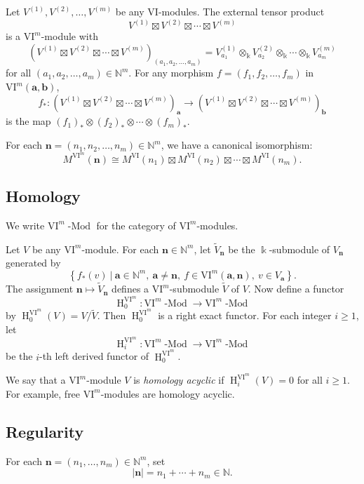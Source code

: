 \documentclass{amsart}
\numberwithin{equation}{section}
\DeclareMathOperator{\Mod}{-Mod}
\DeclareMathOperator{\HH}{H}
\newcommand{\N}{{\mathbb{N}}}
\newcommand{\VI}{{\mathrm{VI}}}
\begin{document}
Let $V^{(1)}, V^{(2)}, \ldots, V^{(m)}$ be any $\VI$-modules. The external tensor product 
\[ V^{(1)}\boxtimes V^{(2)}\boxtimes \cdots\boxtimes V^{(m)} \] 
is a $\VI^m$-module with
\[ \left(V^{(1)}\boxtimes V^{(2)}\boxtimes \cdots\boxtimes V^{(m)}\right)_{(a_1, a_2, \ldots, a_m)} = V^{(1)}_{a_1}\otimes_{\Bbbk} V^{(2)}_{a_2}\otimes_{\Bbbk} \cdots\otimes_{\Bbbk} V^{(m)}_{a_m} \] 
for all $(a_1, a_2, \ldots, a_m)\in \N^m$. For any morphism $f=(f_1, f_2, \ldots, f_m)$ in $\VI^m(\mathbf{a}, \mathbf{b})$, 
\[ f_*:  \left(V^{(1)}\boxtimes V^{(2)}\boxtimes \cdots\boxtimes V^{(m)}\right)_{\mathbf{a}} \to  \left(V^{(1)}\boxtimes V^{(2)}\boxtimes \cdots\boxtimes V^{(m)}\right)_{\mathbf{b}} \]
is the map $(f_1)_* \otimes (f_2)_* \otimes \cdots\otimes (f_m)_*$.  

For each $\mathbf{n}=(n_1, n_2, \ldots, n_m)\in \N^m$, we have a canonical isomorphism:
\begin{equation} \label{eq: tensor}
   M^{\VI^m}(\mathbf{n}) \cong M^{\VI}(n_1) \boxtimes M^{\VI}(n_2) \boxtimes \cdots \boxtimes M^{\VI}(n_m).
\end{equation}

\subsection{Homology}
We write $\VI^m\Mod$ for the category of $\VI^m$-modules. 

Let $V$ be any $\VI^m$-module. For each $\mathbf{n}\in \N^m$, let $\widetilde{V}_{\mathbf{n}}$ be the $\Bbbk$-submodule of $V_{\mathbf{n}}$ generated by 
\[ \left\{ f_*(v) \ \Big|\ \mathbf{a}\in \N^m,\ \mathbf{a}\neq \mathbf{n},\ f\in \VI^m(\mathbf{a}, \mathbf{n}),\ v\in V_{\mathbf{a}} \right\}. \]
The assignment $\mathbf{n}\mapsto \widetilde{V}_{\mathbf{n}}$ defines a $\VI^m$-submodule $\widetilde{V}$ of $V$. Now define a functor
\[ \HH^{\VI^m}_0 : \VI^m\Mod \to \VI^m\Mod \] 
by $ \HH^{\VI^m}_0(V)=V/\widetilde{V}$. Then $\HH^{\VI^m}_0$ is a right exact functor. For each integer $i\geqslant 1$, let 
\[ \HH^{\VI^m}_i : \VI^m\Mod \to \VI^m\Mod \] 
be the $i$-th left derived functor of $\HH^{\VI^m}_0$.

We say that a $\VI^m$-module $V$ is \emph{homology acyclic} if $\HH^{\VI^m}_i(V)=0$ for all $i\geqslant 1$. For example, free $\VI^m$-modules are homology acyclic.


\subsection{Regularity}
For each $\mathbf{n}=(n_1, \ldots, n_m)\in \N^m$, set 
\[ |\mathbf{n}| = n_1 + \cdots + n_m \in \N. \]
\end{document}
